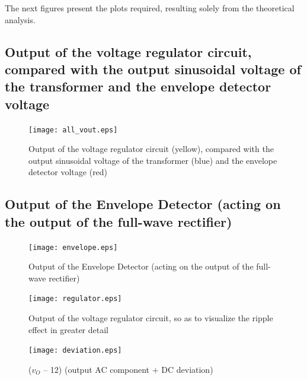  The next figures present the plots required, resulting solely from the theoretical analysis.




\subsection{Output of the voltage regulator circuit, compared with the output sinusoidal voltage of the transformer and the envelope detector voltage}

\par
\begin{figure}[H] \centering
\texttt{[image: all\_vout.eps]}
\caption{Output of the voltage regulator circuit (yellow), compared with the output sinusoidal voltage of the transformer (blue) and the envelope detector voltage (red)}
\label{fig:all_vout}
\end{figure}


\subsection{Output of the Envelope Detector (acting on the output of the full-wave rectifier)}

\par
\begin{figure}[H] \centering
\texttt{[image: envelope.eps]}
\caption{Output of the Envelope Detector (acting on the output of the full-wave rectifier)}
\label{fig:envelope}
\end{figure}



\par
\begin{figure}[H] \centering
\texttt{[image: regulator.eps]}
\caption{Output of the voltage regulator circuit, so as to visualize the ripple effect in greater detail}
\label{fig:regulator}
\end{figure}

\par
\begin{figure}[H] \centering
\texttt{[image: deviation.eps]}
\caption{($v_O$ – 12) (output AC component + DC deviation)}
\label{fig:deviation}
\end{figure}


